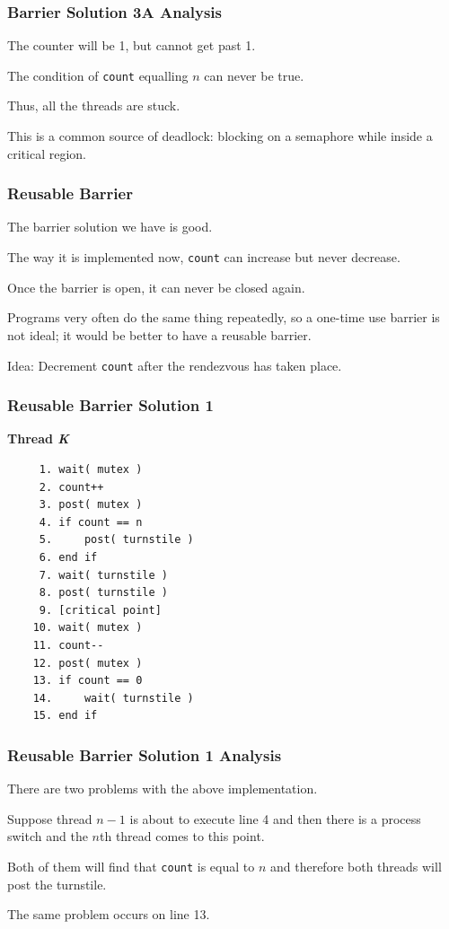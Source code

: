 \begin{frame}
	\frametitle{Barrier Solution 3A Analysis}

	The counter will be 1, but cannot get past 1.

	The condition of \texttt{count} equalling $n$ can never be true.

	Thus, all the threads are stuck.

	This is a common source of deadlock: blocking on a semaphore while inside a critical region.

\end{frame}

\begin{frame}
	\frametitle{Reusable Barrier}

	The barrier solution we have is good.

	The way it is implemented now, \texttt{count} can increase but never decrease.

	Once the barrier is open, it can never be closed again.

	Programs very often do the same thing repeatedly, so a one-time use barrier is not ideal; it would be better to have a reusable barrier.

	Idea: Decrement \texttt{count} after the rendezvous has taken place.

\end{frame}

\begin{frame}[fragile]
	\frametitle{Reusable Barrier Solution 1}

	\textbf{Thread \textit{K}}\vspace{-2em}
	\begin{verbatim}
	 1. wait( mutex )
	 2. count++
	 3. post( mutex )
	 4. if count == n
	 5.     post( turnstile )
	 6. end if
	 7. wait( turnstile )
	 8. post( turnstile )
	 9. [critical point]
	10. wait( mutex )
	11. count--
	12. post( mutex )
	13. if count == 0
	14.     wait( turnstile )
	15. end if
  	\end{verbatim}
	\vspace{-2em}

\end{frame}

\begin{frame}
	\frametitle{Reusable Barrier Solution 1 Analysis}

	There are two problems with the above implementation.

	Suppose thread $n-1$ is about to execute line 4 and then there is a process switch and the $n$th thread comes to this point.

	Both of them will find that \texttt{count} is equal to $n$ and therefore both threads will post the turnstile.

	The same problem occurs on line 13.


\end{frame}

